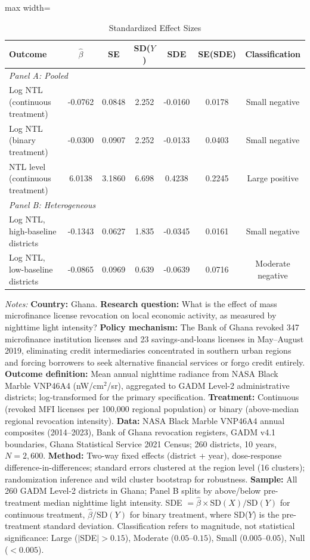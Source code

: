 \begin{table}[htbp]
\centering
\caption{Standardized Effect Sizes}
\label{tab:sde}
\begin{adjustbox}{max width=\textwidth}
\begin{tabular}{lcccccc}
\toprule
Outcome & $\hat{\beta}$ & SE & SD($Y$) & SDE & SE(SDE) & Classification \\
\midrule
\multicolumn{7}{l}{\textit{Panel A: Pooled}} \\
\addlinespace
Log NTL (continuous treatment) & -0.0762 & 0.0848 & 2.252 & -0.0160 & 0.0178 & Small negative \\
Log NTL (binary treatment) & -0.0300 & 0.0907 & 2.252 & -0.0133 & 0.0403 & Small negative \\
NTL level (continuous treatment) & 6.0138 & 3.1860 & 6.698 & 0.4238 & 0.2245 & Large positive \\
\multicolumn{7}{l}{\textit{Panel B: Heterogeneous}} \\
\addlinespace
Log NTL, high-baseline districts & -0.1343 & 0.0627 & 1.835 & -0.0345 & 0.0161 & Small negative \\
Log NTL, low-baseline districts & -0.0865 & 0.0969 & 0.639 & -0.0639 & 0.0716 & Moderate negative \\
\bottomrule
\end{tabular}
\end{adjustbox}
\par\vspace{0.3em}
{\footnotesize \textit{Notes:} \textbf{Country:} Ghana. \textbf{Research question:} What is the effect of mass microfinance license revocation on local economic activity, as measured by nighttime light intensity? \textbf{Policy mechanism:} The Bank of Ghana revoked 347 microfinance institution licenses and 23 savings-and-loans licenses in May--August 2019, eliminating credit intermediaries concentrated in southern urban regions and forcing borrowers to seek alternative financial services or forgo credit entirely. \textbf{Outcome definition:} Mean annual nighttime radiance from NASA Black Marble VNP46A4 (nW/cm$^2$/sr), aggregated to GADM Level-2 administrative districts; log-transformed for the primary specification. \textbf{Treatment:} Continuous (revoked MFI licenses per 100,000 regional population) or binary (above-median regional revocation intensity). \textbf{Data:} NASA Black Marble VNP46A4 annual composites (2014--2023), Bank of Ghana revocation registers, GADM v4.1 boundaries, Ghana Statistical Service 2021 Census; 260 districts, 10 years, $N = 2{,}600$. \textbf{Method:} Two-way fixed effects (district + year), dose-response difference-in-differences; standard errors clustered at the region level (16 clusters); randomization inference and wild cluster bootstrap for robustness. \textbf{Sample:} All 260 GADM Level-2 districts in Ghana; Panel B splits by above/below pre-treatment median nighttime light intensity. SDE $= \hat{\beta} \times \text{SD}(X) / \text{SD}(Y)$ for continuous treatment, $\hat{\beta} / \text{SD}(Y)$ for binary treatment, where SD($Y$) is the pre-treatment standard deviation. Classification refers to magnitude, not statistical significance: Large ($|$SDE$| > 0.15$), Moderate ($0.05$--$0.15$), Small ($0.005$--$0.05$), Null ($< 0.005$).
}
\end{table}

